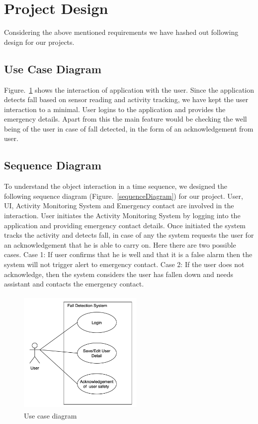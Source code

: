 \documentclass[conference]{IEEEtran}
\begin{document}
\section{Project Design}
Considering the above mentioned requirements we have hashed out following design for our projects.

\subsection{Use Case Diagram}
Figure.~\ref{usecase} shows the interaction of application with the user. Since the application detects fall based on sensor reading and activity tracking, we have kept the user interaction to a minimal. User logins to the application and provides the emergency details. Apart from this the main feature would be checking the well being of the user in case of fall detected, in the form of an acknowledgement from user.

\subsection{Sequence Diagram}
To understand the object interaction in a time sequence, we designed the following sequence diagram (Figure.~\ref{sequenceDiagram}) for our project. User, UI, Activity Monitoring System and Emergency contact are involved in the interaction. User initiates the Activity Monitoring System by logging into the application and providing emergency contact details. Once initiated the system tracks the activity and detects fall, in case of any the system requests the user for an acknowledgement that he is able to carry on. Here there are two possible cases. Case 1: If user confirms that he is well and that it is a false alarm then the system will not trigger alert to emergency contact. Case 2: If the user does not acknowledge, then the system considers the user has fallen down and needs assistant and contacts the emergency contact.

\begin{figure}
\centerline{\includegraphics[width=6cm, height=6cm]{usecase.png}}
\caption{Use case diagram}
\label{usecase}
\end{figure}
\end{document}
